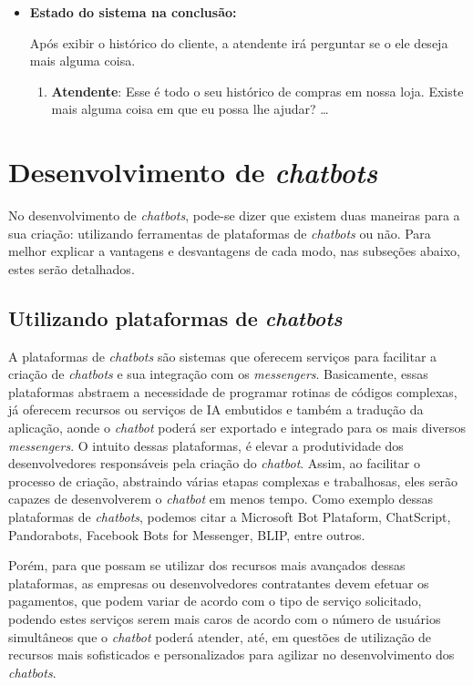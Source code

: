 \begin{itemize}
    \item \textbf{Estado do sistema na conclusão:}
    
    Após exibir o histórico do cliente, a atendente irá perguntar se o ele deseja mais alguma coisa.
    
    \begin{enumerate}
        \item \textbf{Atendente}: Esse é todo o seu histórico de compras em nossa loja. Existe mais alguma coisa em que eu possa lhe ajudar?
        \ldots
    \end{enumerate}
    
    
\end{itemize}


\section{Desenvolvimento de \textit{chatbots}}

No desenvolvimento de \textit{chatbots}, pode-se dizer que existem duas maneiras para a sua criação: utilizando ferramentas de plataformas de \textit{chatbots} ou não. Para melhor explicar a vantagens e desvantagens de cada modo, nas subseções abaixo, estes serão detalhados.

\subsection{Utilizando plataformas de \textit{chatbots}}

A plataformas de \textit{chatbots} são sistemas que oferecem serviços para facilitar a criação de \textit{chatbots} e sua integração com os  \textit{messengers}.
Basicamente, essas plataformas abstraem a necessidade de programar rotinas de códigos complexas, já oferecem recursos ou serviços de IA embutidos e também a tradução da aplicação, aonde o \textit{chatbot} poderá ser exportado e integrado para os mais diversos \textit{messengers}.
O intuito dessas plataformas, é elevar a produtividade dos desenvolvedores responsáveis pela criação do \textit{chatbot}.
Assim, ao facilitar o processo de criação, abstraindo várias etapas complexas e trabalhosas, eles serão capazes de desenvolverem o \textit{chatbot} em menos tempo.
Como exemplo dessas plataformas de \textit{chatbots}, podemos citar a Microsoft Bot Plataform, ChatScript, Pandorabots, Facebook Bots for Messenger, BLIP, entre outros.

Porém, para que possam se utilizar dos recursos mais avançados dessas plataformas, as empresas ou desenvolvedores contratantes devem efetuar os pagamentos, que podem variar de acordo com o tipo de serviço solicitado, podendo estes serviços serem mais caros de acordo com o número de usuários simultâneos que o \textit{chatbot} poderá atender, até, em questões de utilização de recursos mais sofisticados e personalizados para agilizar no desenvolvimento dos \textit{chatbots}. 


